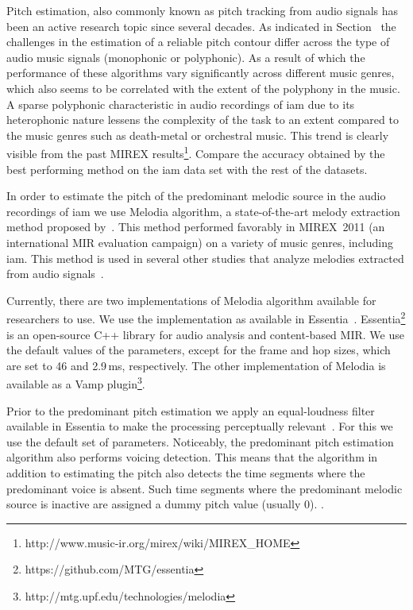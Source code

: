 {Pitch estimation, also commonly known as pitch tracking from audio signals has been an active research topic since several decades. As indicated in Section~ the challenges in the estimation of a reliable pitch contour differ across the type of audio music signals (monophonic or polyphonic). As a result of which the performance of these algorithms vary significantly across different music genres, which also seems to be correlated with the extent of the polyphony in the music. A sparse polyphonic characteristic in audio recordings of \gls{iam} due to its heterophonic nature lessens the complexity of the task to an extent compared to the music genres such as death-metal or orchestral music. This trend is clearly visible from the past MIREX results\footnote{http://www.music-ir.org/mirex/wiki/MIREX\_HOME}. Compare the accuracy obtained by the best performing method on the \gls{iam} data set with the rest of the datasets.

In order to estimate the pitch of the predominant melodic source in the audio recordings of \gls{iam} we use Melodia algorithm, a state-of-the-art melody extraction method proposed by~\cite{Salamon2012}. This method performed favorably in MIREX~2011 (an international MIR evaluation campaign) on a variety of music genres, including \gls{iam}. This method is used in several other studies that analyze melodies extracted from audio signals~\citep{Dutta2014,Ishwar2013,Rao2014,koduri2014intonation,senturk2013score,pikrakis2012tracking}.


Currently, there are two implementations of Melodia algorithm available for researchers to use. We use the implementation as available in Essentia~\citep{essentia}. Essentia\footnote{https://github.com/MTG/essentia} is an open-source C++ library for audio analysis and content-based MIR. We use the default values of the parameters, except for the frame and hop sizes, which are set to 46 and 2.9\,ms, respectively. The other implementation of Melodia is available as a Vamp plugin\footnote{http://mtg.upf.edu/technologies/melodia}. 

Prior to the predominant pitch estimation we apply an equal-loudness filter available in Essentia to make the processing perceptually relevant~. For this we use the default set of parameters. Noticeably, the predominant pitch estimation algorithm also performs voicing detection. This means that the algorithm in addition to estimating the pitch also detects the time segments where the predominant voice is absent. Such time segments where the predominant melodic source is inactive are assigned a dummy pitch value (usually 0). .

}
